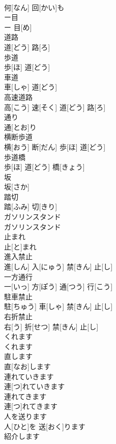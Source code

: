 \documentclass[8pt]{extreport}
\begin{document}
\begin{CJK}{UTF8}{min}
\\	何[なん] 回[かい]も		
\\	ー目	
\\	ー 目[め]		
\\	道路	
\\	道[どう] 路[ろ]		
\\	歩道	
\\	歩[ほ] 道[どう]		
\\	車道	
\\	車[しゃ] 道[どう]		
\\	高速道路	
\\	高[こう] 速[そく] 道[どう] 路[ろ]		
\\	通り	
\\	通[とお]り		
\\	横断歩道	
\\	横[おう] 断[だん] 歩[ほ] 道[どう]		
\\	歩道橋	
\\	歩[ほ] 道[どう] 橋[きょう]		
\\	坂	
\\	坂[さか]		
\\	踏切	
\\	踏[ふみ] 切[きり]		
\\	ガソリンスタンド	
\\	ガソリンスタンド		
\\	止まれ	
\\	止[と]まれ		
\\	進入禁止	
\\	進[しん] 入[にゅう] 禁[きん] 止[し]		
\\	一方通行	
\\	一[いっ] 方[ぽう] 通[つう] 行[こう]		
\\	駐車禁止	
\\	駐[ちゅう] 車[しゃ] 禁[きん] 止[し]		
\\	右折禁止	
\\	右[う] 折[せつ] 禁[きん] 止[し]		
\\	くれます	
\\	くれます		
\\	直します	
\\	直[なお]します		
\\	連れていきます	
\\	連[つ]れていきます		
\\	連れてきます	
\\	連[つ]れてきます		
\\	人を送ります	
\\	人[ひと]を 送[おく]ります		
\\	紹介します	

\end{CJK}
\end{document}
